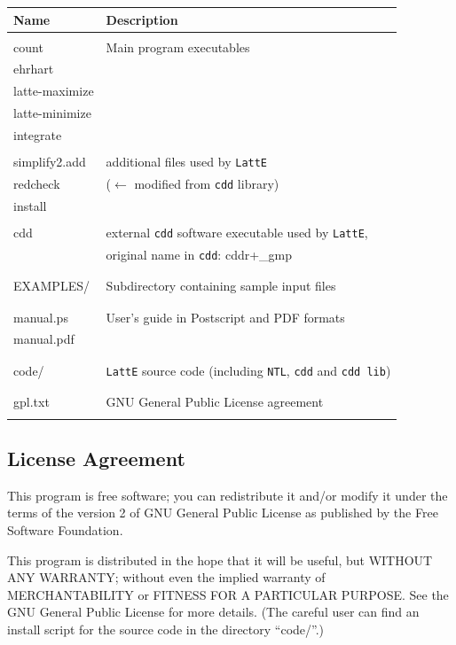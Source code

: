 \documentclass{article}
\begin{document}
\begin{tabular}{|l|l|}
\hline
Name & Description\\
\hline 
& \\
count & Main program executables\\
ehrhart & \\
latte-maximize & \\
latte-minimize & \\
integrate      & \\
& \\

simplify2.add & additional files used by {\tt LattE}\\
redcheck & ($\leftarrow$ modified from {\tt cdd} library) \\
install & \\
& \\
cdd & external {\tt cdd} software executable used by {\tt LattE},\\
& original name in {\tt cdd}: cddr+\_gmp\\
& \\
\hline
& \\
EXAMPLES/ & Subdirectory containing sample input files\\
& \\
\hline
& \\
manual.ps & User's guide in Postscript and PDF formats\\
manual.pdf & \\
& \\
\hline 
& \\
code/ & {\tt LattE} source code (including {\tt NTL}, {\tt cdd} and {\tt cdd lib})\\
& \\
\hline 
& \\
gpl.txt & GNU General Public License agreement\\
& \\
\hline 
\end{tabular}

\subsection{License Agreement}

This program is free software; you can redistribute it and/or
modify it under the terms of the version 2 of GNU General Public
License as published by the Free Software Foundation.

This program is distributed in the hope that it will be useful,
but WITHOUT ANY WARRANTY; without even the implied warranty of
MERCHANTABILITY or FITNESS FOR A PARTICULAR PURPOSE. See the GNU
General Public License for more details. (The careful user can find
an install script for the source code in the directory ``code/''.)
\end{document}
